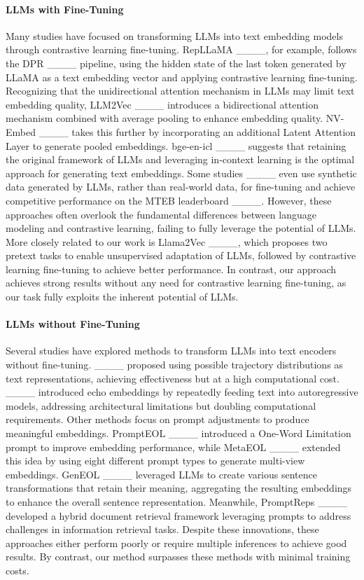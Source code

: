 \paragraph{LLMs with Fine-Tuning}
Many studies have focused on transforming LLMs into text embedding models through contrastive learning fine-tuning. RepLLaMA ____, for example, follows the DPR ____ pipeline, using the hidden state of the last token generated by LLaMA as a text embedding vector and applying contrastive learning fine-tuning. Recognizing that the unidirectional attention mechanism in LLMs may limit text embedding quality, LLM2Vec ____ introduces a bidirectional attention mechanism combined with average pooling to enhance embedding quality. NV-Embed ____ takes this further by incorporating an additional Latent Attention Layer to generate pooled embeddings. bge-en-icl ____ suggests that retaining the original framework of LLMs and leveraging in-context learning is the optimal approach for generating text embeddings. Some studies ____ even use synthetic data generated by LLMs, rather than real-world data, for fine-tuning and achieve competitive performance on the MTEB leaderboard ____. However, these approaches often overlook the fundamental differences between language modeling and contrastive learning, failing to fully leverage the potential of LLMs. More closely related to our work is Llama2Vec ____, which proposes two pretext tasks to enable unsupervised adaptation of LLMs, followed by contrastive learning fine-tuning to achieve better performance. In contrast, our approach achieves strong results without any need for contrastive learning fine-tuning, as our task fully exploits the inherent potential of LLMs.


\paragraph{LLMs without Fine-Tuning}
Several studies have explored methods to transform LLMs into text encoders without fine-tuning. ____ proposed using possible trajectory distributions as text representations, achieving effectiveness but at a high computational cost. ____ introduced echo embeddings by repeatedly feeding text into autoregressive models, addressing architectural limitations but doubling computational requirements. Other methods focus on prompt adjustments to produce meaningful embeddings. PromptEOL ____ introduced a One-Word Limitation prompt to improve embedding performance, while MetaEOL ____ extended this idea by using eight different prompt types to generate multi-view embeddings. GenEOL ____ leveraged LLMs to create various sentence transformations that retain their meaning, aggregating the resulting embeddings to enhance the overall sentence representation. Meanwhile, PromptReps ____ developed a hybrid document retrieval framework leveraging prompts to address challenges in information retrieval tasks. Despite these innovations, these approaches either perform poorly or require multiple inferences to achieve good results. By contrast, our method surpasses these methods with minimal training costs.